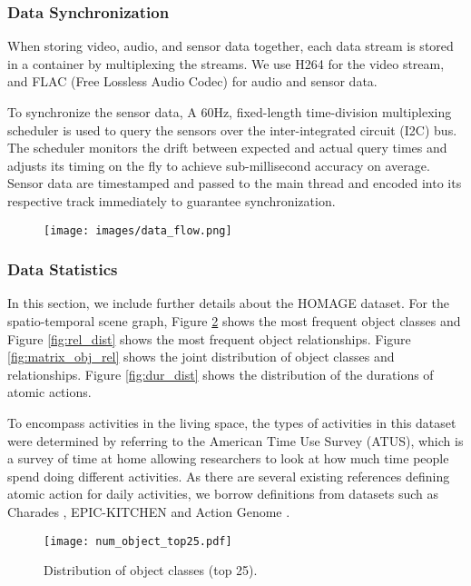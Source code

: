 \documentclass[final]{cvpr}
\begin{document}
\subsubsection*{Data Synchronization}


When storing video, audio, and sensor data together, each data stream is stored in a container by multiplexing the streams. We use H264 for the video stream, and FLAC (Free Lossless Audio Codec) for audio and sensor data.

To synchronize the sensor data, A 60Hz, fixed-length time-division multiplexing scheduler is used to query the sensors over the inter-integrated circuit (I2C) bus. The scheduler monitors the drift between expected and actual query times and adjusts its timing on the fly to achieve sub-millisecond accuracy on average. Sensor data are timestamped and passed to the main thread and encoded into its respective track immediately to guarantee synchronization.

 
\begin{figure}[t]
\begin{center}
    \centering
    \texttt{[image: images/data\_flow.png]}
    \label{fig:data_flow}
    \centering
\end{center}
\end{figure}

\subsubsection*{Data Statistics}

In this section, we include further details about the HOMAGE dataset. For the spatio-temporal scene graph, Figure \ref{fig:obj_dist} shows the most frequent object classes and Figure \ref{fig:rel_dist} shows the most frequent object relationships. Figure \ref{fig:matrix_obj_rel} shows the joint distribution of object classes and relationships. Figure \ref{fig:dur_dist} shows the distribution of the durations of atomic actions.

To encompass activities in the living space, the types of activities in this dataset were determined by referring to the American Time Use Survey (ATUS), which is a survey of time at home allowing researchers to look at how much time people spend doing different activities. As there are several existing references defining atomic action for daily activities, we borrow definitions from datasets such as Charades \cite{charades}, EPIC-KITCHEN \cite{epic} and Action Genome \cite{action_genome}.
\begin{figure}[t]
    \begin{center}
    \texttt{[image: num\_object\_top25.pdf]}
    \caption{Distribution of object classes (top 25). \label{fig:obj_dist}}
    \end{center}
\end{figure}
\end{document}
